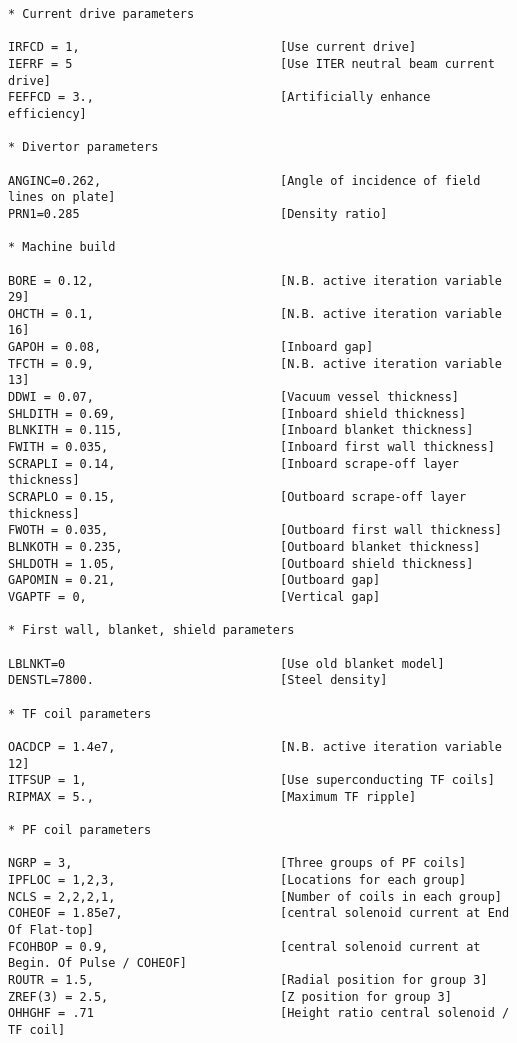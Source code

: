 \documentclass[11pt,a4paper]{report}
\begin{document}
\begin{verbatim}
* Current drive parameters

IRFCD = 1,                            [Use current drive]
IEFRF = 5                             [Use ITER neutral beam current drive]
FEFFCD = 3.,                          [Artificially enhance efficiency]

* Divertor parameters

ANGINC=0.262,                         [Angle of incidence of field lines on plate]
PRN1=0.285                            [Density ratio]

* Machine build

BORE = 0.12,                          [N.B. active iteration variable 29]
OHCTH = 0.1,                          [N.B. active iteration variable 16]
GAPOH = 0.08,                         [Inboard gap]
TFCTH = 0.9,                          [N.B. active iteration variable 13]
DDWI = 0.07,                          [Vacuum vessel thickness]
SHLDITH = 0.69,                       [Inboard shield thickness]
BLNKITH = 0.115,                      [Inboard blanket thickness]
FWITH = 0.035,                        [Inboard first wall thickness]
SCRAPLI = 0.14,                       [Inboard scrape-off layer thickness]
SCRAPLO = 0.15,                       [Outboard scrape-off layer thickness]
FWOTH = 0.035,                        [Outboard first wall thickness]
BLNKOTH = 0.235,                      [Outboard blanket thickness]
SHLDOTH = 1.05,                       [Outboard shield thickness]
GAPOMIN = 0.21,                       [Outboard gap]
VGAPTF = 0,                           [Vertical gap]

* First wall, blanket, shield parameters

LBLNKT=0                              [Use old blanket model]
DENSTL=7800.                          [Steel density]

* TF coil parameters

OACDCP = 1.4e7,                       [N.B. active iteration variable 12]
ITFSUP = 1,                           [Use superconducting TF coils]
RIPMAX = 5.,                          [Maximum TF ripple]

* PF coil parameters

NGRP = 3,                             [Three groups of PF coils]
IPFLOC = 1,2,3,                       [Locations for each group]
NCLS = 2,2,2,1,                       [Number of coils in each group]
COHEOF = 1.85e7,                      [central solenoid current at End Of Flat-top]
FCOHBOP = 0.9,                        [central solenoid current at Begin. Of Pulse / COHEOF]
ROUTR = 1.5,                          [Radial position for group 3]
ZREF(3) = 2.5,                        [Z position for group 3]
OHHGHF = .71                          [Height ratio central solenoid / TF coil]


\end{verbatim}
\end{document}
